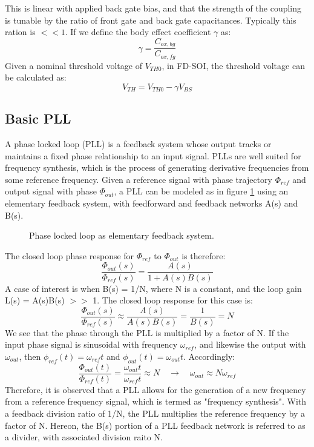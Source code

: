 	This is linear with applied back gate bias, and that the strength of the coupling is tunable by the ratio of front gate and back gate capacitances. Typically this ration is $<<1$. If we define the body effect coefficient $\gamma$ as:
	\begin{equation}
		\gamma = \frac{C_{ox,bg}}{C_{ox,fg}}
	\end{equation}
	Given a nominal threshold voltage of $V_{TH0}$, in FD-SOI, the threshold voltage can be calculated as:
	\begin{equation}
		V_{TH} = V_{TH0} - \gamma V_{BS}
	\end{equation}


	\subsection{Basic PLL}
	A phase locked loop (PLL) is a feedback system whose output tracks or maintains a fixed phase relationship to an input signal. PLLs are well suited for frequency synthesis, which is the process of generating derivative frequencies from some reference frequency. Given a reference signal with phase trajectory $\Phi_{ref}$ and output signal with phase $\Phi_{out}$, a PLL can be modeled as in figure \ref{fig:basic_fb} using an elementary feedback system, with feedforward and feedback networks A(s) and B(s). 
	\begin{figure}[htb!]
		\center
		\caption{Phase locked loop as elementary feedback system.}
		\label{fig:basic_fb}
	\end{figure}
	\FloatBarrier
	The closed loop phase response for $\Phi_{ref}$ to $\Phi_{out}$ is therefore:
	\begin{equation}
		\frac{\Phi_{out}(s)}{\Phi_{ref}(s)} = \frac{A(s)}{1+A(s)B(s)}
	\end{equation}
	A case of interest is when B(s) = 1/N, where N is a constant, and the loop gain L(s) = A(s)B(s) $>>$ 1. The closed loop response for this case is:
	\begin{equation}\label{mult_by_n}
		\frac{\Phi_{out}(s)}{\Phi_{ref}(s)} \approx \frac{A(s)}{A(s)B(s)} = \frac{1}{B(s)} = N
	\end{equation}
	We see that the phase through the PLL is multiplied by a factor of N. If the input phase signal is sinusoidal with frequency $\omega_{ref}$, and likewise the output with $\omega_{out}$, then $\phi_{ref}(t)=\omega_{ref}t$ and $\phi_{out}(t)=\omega_{out}t$. Accordingly:
	\begin{equation}
		\frac{\Phi_{out}(t)}{\Phi_{ref}(t)} = \frac{\omega_{out}t}{\omega_{ref}t} \approx N \hspace{1em} \rightarrow \hspace{1em} \omega_{out} \approx N\omega_{ref}
	\end{equation}
	Therefore, it is observed that a PLL allows for the generation of a new frequency from a reference frequency signal, which is termed as "frequency synthesis". With a feedback division ratio of 1/N, the PLL multiplies the reference frequency by a factor of N. Hereon, the B(s) portion of a PLL feedback network is referred to as a divider, with associated division raito N.

